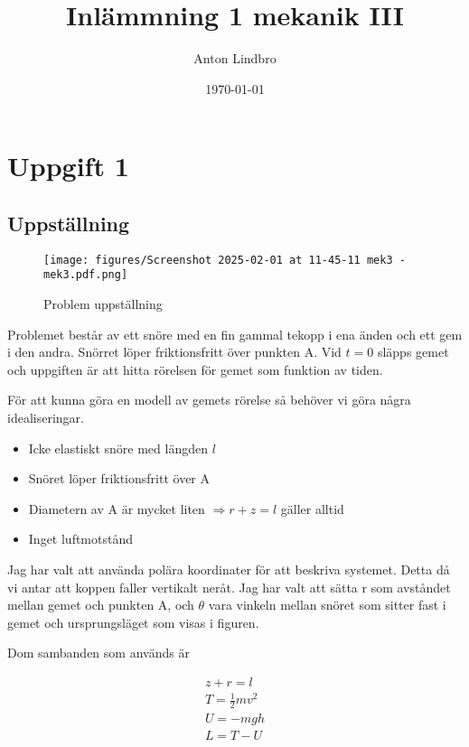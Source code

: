 \documentclass[a4paper]{article}
\title{Inlämmning 1 mekanik III}
\author{Anton Lindbro}
\date{\today}
\begin{document}
\maketitle

\section*{Uppgift 1}

\subsection*{Uppställning}

\begin{figure}[H]
    \begin{small}
        \begin{center}
            \texttt{[image: figures/Screenshot 2025-02-01 at 11-45-11 mek3 - mek3.pdf.png]}
        \end{center}
        \caption{Problem uppställning}
        \label{fig:uppställning}
    \end{small}
\end{figure}

Problemet består av ett snöre med en fin gammal tekopp i ena änden och ett gem i den andra. Snörret löper friktionsfritt över punkten A. Vid $t=0$ släpps gemet och uppgiften är att hitta rörelsen för gemet som funktion av tiden.

För att kunna göra en modell av gemets rörelse så behöver vi göra några idealiseringar.

\begin{itemize}
    \item Icke elastiskt snöre med längden $l$
    \item Snöret löper friktionsfritt över A
    \item Diametern av A är mycket liten $\Rightarrow r+z=l$ gäller alltid
    \item Inget luftmotstånd
\end{itemize}

Jag har valt att använda polära koordinater för att beskriva systemet. Detta då vi antar att koppen faller vertikalt neråt. Jag har valt att sätta r som avståndet mellan gemet och punkten A, och $\theta$ vara vinkeln mellan snöret som sitter fast i gemet och ursprungsläget som visas i figuren. 

Dom sambanden som används är 

\begin{align}
    z+r=l\\
    T = \frac{1}{2}mv^2\\
    U = -mgh\\
    L = T-U
\end{align}
\end{document}
